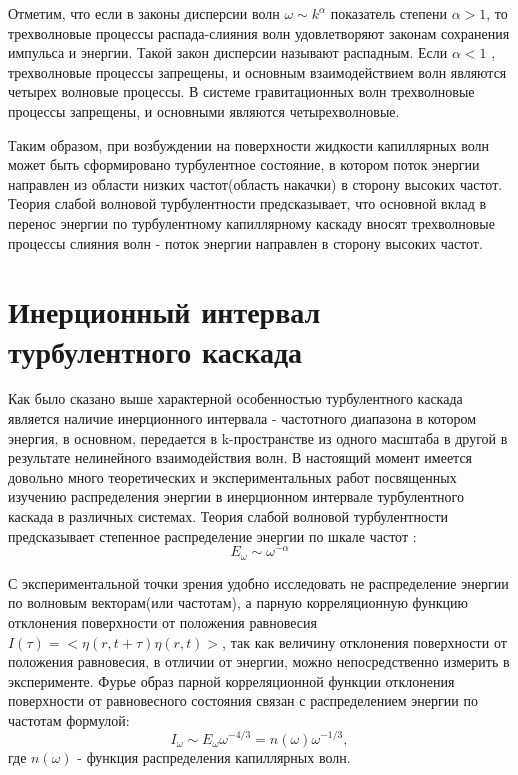 Отметим, что если в законы дисперсии волн $\omega \sim k ^ \alpha$ показатель степени $\alpha > 1$, то трехволновые процессы распада-слияния волн удовлетворяют законам сохранения импульса и энергии. Такой закон дисперсии называют распадным. Если $\alpha < 1$ , трехволновые процессы запрещены, и основным взаимодействием волн являются четырех волновые процессы. В системе гравитационных волн трехволновые процессы запрещены, и основными являются четырехволновые. 

Таким образом, при возбуждении на поверхности жидкости капиллярных волн может быть сформировано турбулентное состояние, в котором поток энергии направлен из области низких частот(область накачки) в сторону высоких частот. Теория слабой волновой турбулентности \cite{Zakharov} предсказывает, что основной вклад в перенос энергии по турбулентному капиллярному каскаду вносят трехволновые процессы слияния волн - поток энергии направлен в сторону высоких частот. 


\section{Инерционный интервал турбулентного каскада}%

Как было сказано выше характерной особенностью турбулентного каскада является наличие инерционного интервала - частотного диапазона в котором энергия, в основном, передается в k-пространстве из одного масштаба в другой в результате нелинейного взаимодействия волн. 
В настоящий момент имеется довольно много теоретических и экспериментальных работ посвященных изучению распределения энергии в инерционном интервале турбулентного каскада в различных системах. Теория слабой волновой турбулентности предсказывает степенное распределение энергии по шкале частот \cite{Zakharov}:
\begin{equation}
\label{eq:EOmega}
E_\omega \sim \omega^{-\alpha}
\end{equation}

С экспериментальной точки зрения удобно исследовать не распределение энергии по волновым векторам(или частотам), а парную корреляционную функцию отклонения поверхности от положения равновесия $I(\tau)=<\eta(r, t+\tau)\eta(r,t)>$, так как величину отклонения поверхности от положения равновесия, в отличии от энергии, можно непосредственно измерить в эксперименте. Фурье образ парной корреляционной функции отклонения поверхности от равновесного состояния связан с распределением энергии по частотам формулой:
\begin{equation}
\label{eq:EOmegaI}
I_\omega \sim E_\omega \omega^{-4/3} = n(\omega) \omega^{-1/3},
\end{equation}
где $n(\omega)$ - функция распределения капиллярных волн.

